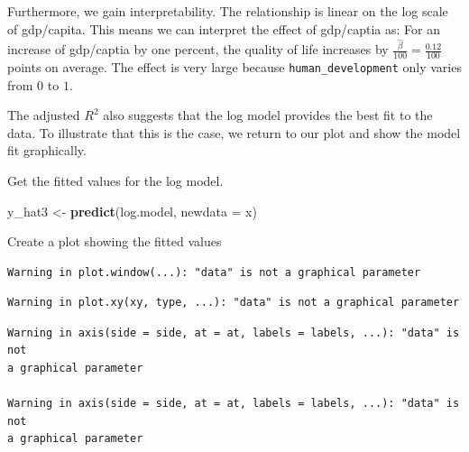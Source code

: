 \documentclass[]{article}
\newenvironment{Shaded}{\begin{snugshade}}{\end{snugshade}}
\newcommand{\DataTypeTok}[1]{\textcolor[rgb]{0.13,0.29,0.53}{#1}}
\newcommand{\DecValTok}[1]{\textcolor[rgb]{0.00,0.00,0.81}{#1}}
\newcommand{\KeywordTok}[1]{\textcolor[rgb]{0.13,0.29,0.53}{\textbf{#1}}}
\newcommand{\NormalTok}[1]{#1}
\newcommand{\OperatorTok}[1]{\textcolor[rgb]{0.81,0.36,0.00}{\textbf{#1}}}
\newcommand{\OtherTok}[1]{\textcolor[rgb]{0.56,0.35,0.01}{#1}}
\newcommand{\StringTok}[1]{\textcolor[rgb]{0.31,0.60,0.02}{#1}}
\begin{document}
Furthermore, we gain interpretability. The relationship is linear on the log scale of gdp/capita. This means we can interpret the effect of gdp/captia as: For an increase of gdp/captia by one percent, the quality of life increases by \(\frac{\hat{\beta}}{100} = \frac{0.12}{100}\) points on average. The effect is very large because \texttt{human\_development} only varies from \(0\) to \(1\).

The adjusted \(R^2\) also suggests that the log model provides the best fit to the data. To illustrate that this is the case, we return to our plot and show the model fit graphically.

Get the fitted values for the log model.

\begin{Shaded}
\begin{Highlighting}[]
\NormalTok{y_hat3 <-}\StringTok{ }\KeywordTok{predict}\NormalTok{(log.model, }\DataTypeTok{newdata =}\NormalTok{ x)}
\end{Highlighting}
\end{Shaded}

Create a plot showing the fitted values

\begin{Shaded}
\end{Shaded}

\begin{verbatim}
Warning in plot.window(...): "data" is not a graphical parameter
\end{verbatim}

\begin{verbatim}
Warning in plot.xy(xy, type, ...): "data" is not a graphical parameter
\end{verbatim}

\begin{verbatim}
Warning in axis(side = side, at = at, labels = labels, ...): "data" is not
a graphical parameter

Warning in axis(side = side, at = at, labels = labels, ...): "data" is not
a graphical parameter
\end{verbatim}
\end{document}
